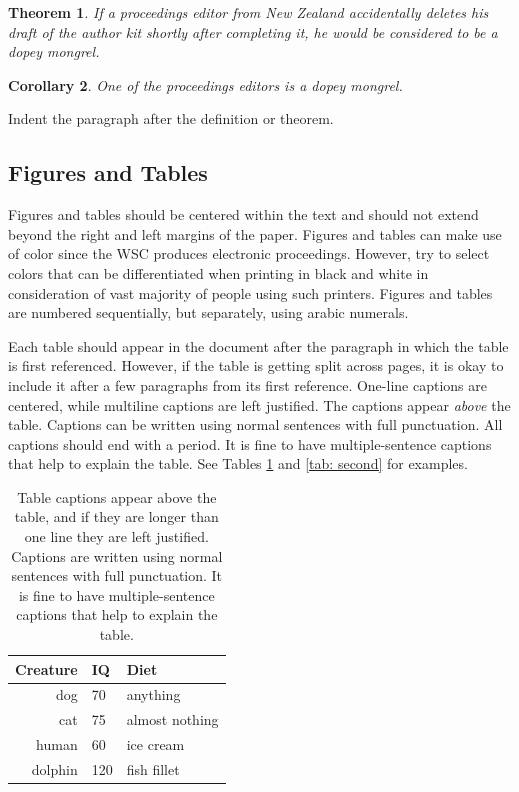 \documentclass{wscpaperproc}
\theoremstyle{wsc}
\newtheorem{theorem}{Theorem}
\newtheorem{corollary}[theorem]{Corollary}
\begin{document}
\begin{theorem}
If a proceedings editor from New Zealand accidentally deletes his draft of the author kit shortly after completing it, he would be considered to be a dopey mongrel.
\end{theorem}

\begin{corollary}
One of the proceedings editors is a dopey mongrel.
\end{corollary}

Indent the paragraph after the definition or theorem.

\subsection{Figures and Tables}
\label{sec:graphics}
Figures and tables should be centered within the text and should not extend beyond the right and left margins of the paper.
Figures and tables can make use of color since the WSC produces electronic proceedings.
However, try to select colors that can be differentiated when printing in black and white in consideration of vast majority of people using such printers. Figures and tables are numbered sequentially, but separately, using arabic numerals.

Each table should appear in the document after the paragraph in which the table is first referenced. However, if the table is getting split across pages, it is okay to include it after a few paragraphs from its first reference.
One-line captions are centered, while multiline captions are left justified.
The captions appear {\em above} the table. 
Captions can be written using normal sentences with full punctuation. All captions should end with a period. It is fine to have multiple-sentence captions that help to explain the table. 
See Tables \ref{tab: first} and \ref{tab: second} for examples.

\begin{table}[htb]
\centering
\caption{Table captions appear above the table, and if they are longer than one line they are left justified. Captions are written using normal sentences with full punctuation. It is fine to have multiple-sentence captions that help to explain the table.\label{tab: first}}
\begin{tabular}{rll}
\hline
Creature & IQ & Diet\\ \hline
dog & 70 & anything\\
cat & 75 & almost nothing\\
human & 60 & ice cream \\
dolphin & 120 & fish fillet\\
\hline
\end{tabular}
\end{table}
\end{document}
